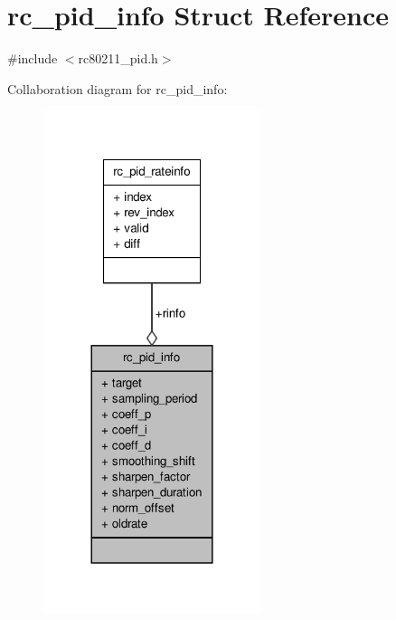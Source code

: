 \hypertarget{structrc__pid__info}{\section{rc\-\_\-pid\-\_\-info Struct Reference}
\label{structrc__pid__info}
}


{\ttfamily \#include $<$rc80211\-\_\-pid.\-h$>$}



Collaboration diagram for rc\-\_\-pid\-\_\-info\-:
\nopagebreak
\begin{figure}[H]
\begin{center}
\leavevmode
\includegraphics[width=180pt]{structrc__pid__info__coll__graph}
\end{center}
\end{figure}
